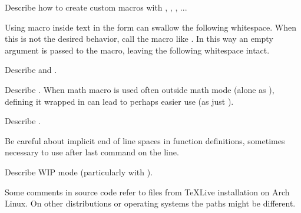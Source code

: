 \begin{Todo}
    Describe how to create custom macros with \macro{\NewDocumentCommand}, \macro{\RenewDocumentCommand}, \macro{\NewCommandCopy}, ...
\end{Todo}
\begin{remark}
    Using macro inside text in the form \macro{\foo} can swallow the following whitespace.
    When this is not the desired behavior, call the macro like \macro{\foo{}}.
    In this way an empty argument is passed to the macro, leaving the following whitespace intact.
\end{remark}
\begin{Todo}
    Describe \macro{\makeatletter} and \macro{\makeatother}.
\end{Todo}
\begin{Todo}
    Describe \macro{\ensuremath}.
    When math macro is used often outside math mode (alone as ), defining it wrapped in \macro{\ensuremath} can lead to perhaps easier use (as just ).
\end{Todo}
\begin{Todo}
    Describe .
\end{Todo}
\begin{Note}
    Be careful about implicit end of line spaces in function definitions, sometimes necessary to use \macrobox{\texttt{\%}} after last command on the line.
\end{Note}
\begin{Todo}
    Describe WIP mode (particularly with ).
\end{Todo}
\begin{Note}
    Some comments in source code refer to files from \TeX{}Live installation on Arch Linux.
    On other distributions or operating systems the paths might be different.
\end{Note}
